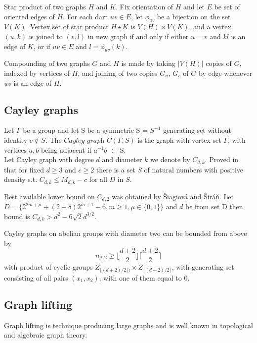 \documentclass[a4paper,11pt,twoside]{report}%
\begin{document}
Star product of two graphs $H$ and $K$. Fix orientation of $H$ and let $E$ be set of oriented edges of $H$. For each dart $uv \in E$, let $\phi_{uv}$ be a bijection on the set $V(K)$. Vertex set of star product $H \star K$ is $V(H) \times V(K)$, and a vertex $(u,k)$ is joined to $(v,l)$ in new graph if and only if either $u = v$ and $kl$ is an edge of $K$, or if $uv \in E$ and $l = \phi_{uv}(k)$. 

Compounding of two graphs $G$ and $H$ is made by taking $|V(H)|$ copies of $G$, indexed by vertices of $H$, and joining of two copies $G_{u}$, $G_{v}$ of $G$ by edge whenever $uv$ is an edge of $H$.

\subsection{Cayley graphs}
Let $\Gamma$ be a group and let S be a symmetric S = $S^{-1}$ generating set without identity $e\not\in S$. The $\textit{Cayley graph}$ $C(\Gamma,S)$ is the graph with vertex set $\Gamma$, with vertices $a,b$ being adjacent if $a^{-1}b$ $\in$ S. \\

Let Cayley graph with degree $d$ and diameter $k$ we denote by $C_{d,k}$. Proved in ~\cite{Jajcay-Macaj-Siran} that for fixed $d \geq 3$ and $c \geq 2$ there is a set $S$ of natural numbers with positive density s.t. $C_{d,k} \leq M_{d,k}-c$ for all $D$ in $S$. 
 
Best available lower bound on $C_{d,2}$ was obtained by Šiagiová and Širáň. Let $D = \{ 2^{2m+\mu}+(2+\delta)2^{m+1}-6,m \geq 1, \mu \in \{0,1\} \}$ and $d$ be from set D then bound is $C_{d,k} > d^{2} - 6\sqrt{2}d^{3/2}$.

Cayley graphs on abelian groups with diameter two can be bounded from above by 
\begin{equation*}
	n_{d,2} \geq \lfloor \frac{d+2}{2} \rfloor \lceil \frac{d + 2}{2} \rceil
\end{equation*}	
with product of cyclic groups $Z_{ \lfloor (d+2)/2  \rfloor) } \times Z_{ \lceil (d+2)/2 \rceil }$, with generating set consisting of all pairs $(x_1,x_2)$, with one of them equal to 0.

\subsection{Graph lifting}
Graph lifting is technique producing large graphs and is well known in topological and algebraic graph theory.~\cite{Gross-Tucker} 
\end{document}
